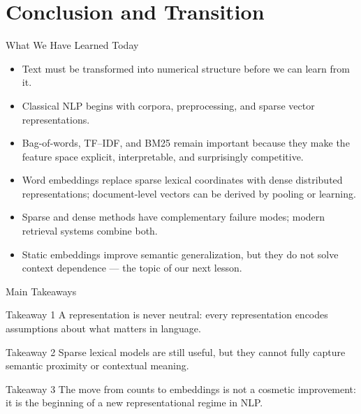 \documentclass[aspectratio=169]{beamer}
\begin{document}
\section{Conclusion and Transition}
%
\begin{frame}{What We Have Learned Today}
\begin{itemize}
    \item Text must be transformed into numerical structure before we can learn from it.
    \item Classical NLP begins with corpora, preprocessing, and sparse vector representations.
    \item Bag-of-words, TF--IDF, and BM25 remain important because they make the feature space explicit, interpretable, and surprisingly competitive.
    \item Word embeddings replace sparse lexical coordinates with dense distributed representations; document-level vectors can be derived by pooling or learning.
    \item Sparse and dense methods have complementary failure modes; modern retrieval systems combine both.
    \item Static embeddings improve semantic generalization, but they do not solve context dependence --- the topic of our next lesson.
\end{itemize}
\end{frame}
%
%
\begin{frame}{Main Takeaways}
\begin{block}{Takeaway 1}
A representation is never neutral: every representation encodes assumptions about what matters in language.
\end{block}

\begin{block}{Takeaway 2}
Sparse lexical models are still useful, but they cannot fully capture semantic proximity or contextual meaning.
\end{block}

\begin{block}{Takeaway 3}
The move from counts to embeddings is not a cosmetic improvement: it is the beginning of a new representational regime in NLP.
\end{block}
\end{frame}
%
%
\end{document}
